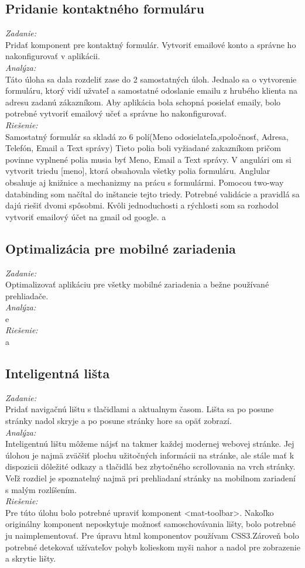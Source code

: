 \documentclass[11pt, oneside]{report}
\begin{document}
\subsection*{Pridanie kontaktného formuláru }
\textit{Zadanie:}\\
Pridať komponent pre kontaktný formulár. Vytvoriť emailové konto a správne ho nakonfigurovať v aplikácii.
\\\textit{Analýza:}\\
Táto úloha sa dala rozdeliť zase do 2 samostatných úloh. Jednalo sa o vytvorenie formuláru, ktorý vidí užvateľ a  samostatné odoslanie emailu z hrubého klienta na adresu zadanú zákazníkom. Aby aplikácia bola schopná posielať emaily, bolo potrebné vytvoriť emailový učeť a správne ho nakonfigurovať.
\\\textit{Riešenie:}\\
Samostatný formulár sa skladá zo 6 polí(Meno odosielateľa,spoločnosť, Adresa, Telefón, Email a Text správy) Tieto polia boli vyžiadané zakazníkom  pričom povinne vyplnené polia musia byť Meno, Email a Text správy. V angulári om si vytvorit triedu [meno], ktorá obsahovala všetky polia formuláru. Anglular obsahuje aj knižnice a mechanizmy na prácu s formulármi. Pomocou two-way databinding som načítal do inštancie tejto triedy. Potrebné validácie a pravidlá sa dajú riešiť dvomi spôsobmi.  Kvôli jednoduchosti a rýchlosti som sa rozhodol vytvoriť emailový účet na gmail od google.
a
\subsection*{Optimalizácia pre mobilné zariadenia}
\textit{Zadanie:}\\
Optimalizovať aplikáciu pre všetky mobilné zariadenia a bežne používané prehliadače.
\\\textit{Analýza:}\\
e
\\\textit{Riešenie:}\\
a
\subsection*{Inteligentná lišta }
\textit{Zadanie:}\\
Pridať navigačnú lištu s tlačidlami a aktualnym časom. Lišta sa po posune stránky nadol skryje a po posune stránky hore sa opäť zobrazí.
\\\textit{Analýza:}\\
Inteligentnú lištu môžeme nájsť na takmer každej modernej webovej stránke. Jej úlohou je najmä zväčšiť plochu užitočných informácii na stránke, ale stále mať k dispozicii dôležité odkazy a tlačidlá  bez  zbytočného scrollovania na vrch stránky. Veľž rozdiel je spoznatelný najmä pri prehliadaní stránky na mobilnom zariadení s malým rozlíšením. 
\\\textit{Riešenie:}\\
Pre túto úlohu bolo potrebné upraviť komponent \textsf{<mat-toolbar>}. Nakoľko originálny komponent neposkytuje možnosť samoschovávania lišty, bolo potrebné ju naimplementovať. Pre úpravu html komponentov používam CSS3.Zároveň bolo potrebné detekovať užívateľov pohyb kolieskom myši nahor a nadol pre zobrazenie a skrytie lišty.
\end{document}
